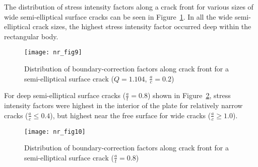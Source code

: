 The distribution of stress intensity factors along a crack front for various sizes of wide semi-elliptical surface cracks can be seen in Figure~\ref{fig:sif_02_ellipse}. In all the wide semi-elliptical crack sizes, the highest stress intensity factor occurred deep within the rectangular body.
\begin{figure}[tbp]
\centering
	   \texttt{[image: nr\_fig9]}
      \caption{Distribution of bound\-ary-cor\-rec\-tion factors along crack front for a semi-ellip\-tical surface crack ($Q=1.104$, $\frac{a}{c}=0.2$)}
      \label{fig:sif_02_ellipse}
\end{figure}
For deep semi-elliptical surface cracks ($\frac{a}{t}=0.8$) shown in Figure~\ref{fig:sif_08_thickness}, stress intensity factors were highest in the interior of the plate for relatively narrow cracks ($\frac{a}{c} \leq 0.4$), but highest near the free surface for wide cracks ($\frac{a}{c} \geq 1.0$).
\begin{figure}[tbp]
\centering
	   \texttt{[image: nr\_fig10]}
      \caption{Distribution of bound\-ary-cor\-rec\-tion factors along crack front for a semi-ellip\-tical surface crack ($\frac{a}{t}=0.8$)}
      \label{fig:sif_08_thickness}
\end{figure}

